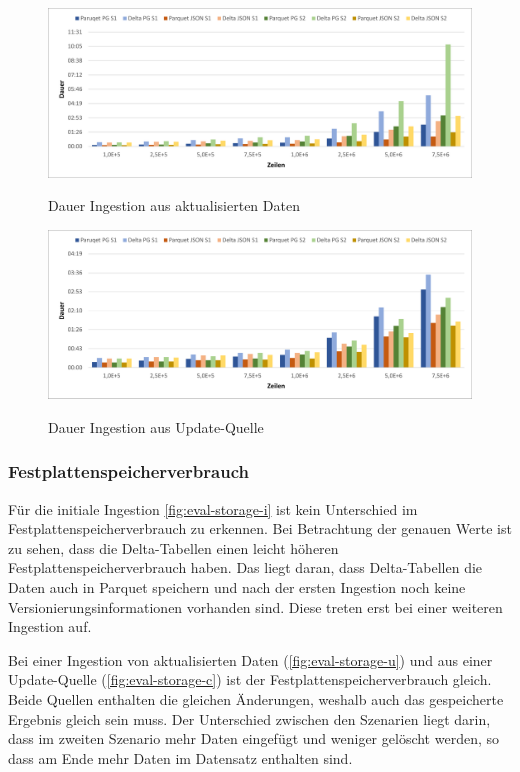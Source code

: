 \begin{figure}
    \centering
    \caption{Dauer Ingestion aus aktualisierten Daten}
    \includegraphics[width=\textwidth]{Grafiken/Evaluierung/Zeit-Update}
    \label{fig:eval-time-u}
\end{figure}

\begin{figure}
    \centering
    \caption{Dauer Ingestion aus Update-Quelle}
    \includegraphics[width=\textwidth]{Grafiken/Evaluierung/Zeit-Cdc}
    \label{fig:eval-time-c}
\end{figure}

\subsubsection{Festplattenspeicherverbrauch}

Für die initiale Ingestion \cref{fig:eval-storage-i} ist kein Unterschied im Festplattenspeicherverbrauch zu erkennen.
Bei Betrachtung der genauen Werte ist zu sehen, dass die Delta-Tabellen einen leicht höheren Festplattenspeicherverbrauch haben.
Das liegt daran, dass Delta-Tabellen die Daten auch in Parquet speichern und nach der ersten Ingestion noch keine Versionierungsinformationen vorhanden sind.
Diese treten erst bei einer weiteren Ingestion auf.

Bei einer Ingestion von aktualisierten Daten (\cref{fig:eval-storage-u}) und aus einer Update-Quelle (\cref{fig:eval-storage-c}) ist der Festplattenspeicherverbrauch gleich.
Beide Quellen enthalten die gleichen Änderungen, weshalb auch das gespeicherte Ergebnis gleich sein muss.
Der Unterschied zwischen den Szenarien liegt darin, dass im zweiten Szenario mehr Daten eingefügt und weniger gelöscht werden, so dass am Ende mehr Daten im Datensatz enthalten sind.

